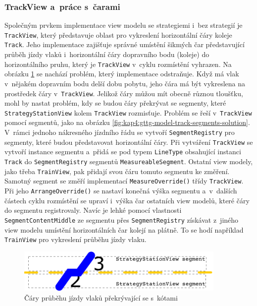 \subsubsection*{TrackView a~práce s~čarami}
\label{kap4:track_view_with_line_paint}
Společným prvkem implementace view modelu se strategiemi i~bez strategií je \texttt{TrackView}, který představuje oblast pro vykreslení horizontální čáry koleje \texttt{Track}. Jeho implementace zajišťuje správné umístění šikmých čar představující průběh jízdy vlaků i~horizontální čáry dopravního bodu (koleje) do horizontálního pruhu, který je  \texttt{TrackView} v~cyklu rozmístění vyhrazen. Na obrázku \ref{fig:kap4:gttg-model-track-segments} se nachází problém, který implementace odstraňuje. Když má vlak v~nějakém dopravním bodu delší dobu pobytu, jeho čára má být vykreslena na prostředek čáry v~\texttt{TrackView}. Jelikož čáry můžou mít obecně různou tloušťku, mohl by nastat problém, kdy se budou čáry překrývat se segmenty, které \texttt{StrategyStationView} kolem \texttt{TrackView} rozmisťuje. Problém se řeší v~\texttt{TrackView} pomocí segmentů, jako na obrázku \ref{fig:kap4:gttg-model-track-segments-solution}. V~rámci jednoho nákresného jízdního řádu se vytvoří \texttt{SegmentRegistry} pro segmenty, které budou představovat horizontální čáry. Při vytváření \texttt{TrackView} se vytvoří instance segmentu a~přidá se pod typem \texttt{LineType} obsahující instanci \texttt{Track} do \texttt{SegmentRegistry} segmentů \texttt{MeasureableSegment}. Ostatní view modely, jako třeba \texttt{TrainView}, pak přidají svou čáru tomuto segmentu ke změření. Samotný segment se změří implementací \texttt{MeasureOverride()} třídy \texttt{TrackView}. Při jeho \texttt{ArrangeOverride()} se nastaví konečná výška segmentu a~v~dalších částech cyklu rozmístění se upraví i~výška čar ostatních view modelů, které čáry do segmentu registrovaly. Navíc je lehké pomocí vlastnosti \texttt{SegmentContentMiddle} ze segmentu přes \texttt{SegmentRegistry} získávat z~jiného view modelu umístění horizontálních čar kolejí na plátně. To se hodí například \texttt{TrainView} pro vykreslení průběhu jízdy vlaku. 

\begin{figure}[!hbt]
	\includegraphics[width=0.9\textwidth]{../img/kap4_trackline_measure}
	\caption{Čáry průběhu jízdy vlaků překrývající se s~kótami}
	\label{fig:kap4:gttg-model-track-segments}
\end{figure}

